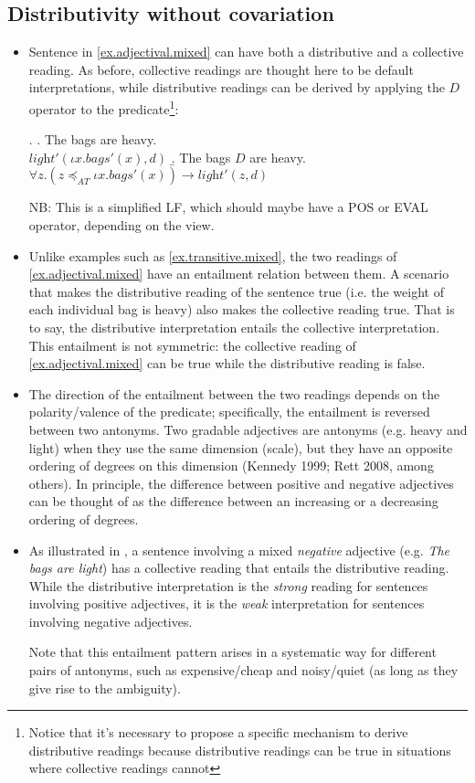 \documentclass[a4paper]{article}
\newcommand{\addMM}[1]{{\leavevmode\color{red}#1}}
\begin{document}
\subsection{Distributivity without covariation}
\begin{itemize}
\item Sentence in \ref{ex.adjectival.mixed} can have both a distributive and a collective reading.  As before, collective readings are thought here to be default interpretations, while distributive readings can be derived by applying the $D$ operator to the predicate\footnote{Notice that it's necessary to propose a specific mechanism to derive distributive readings because distributive readings can be true in situations where collective readings cannot}:

\ex.
\a. The bags are heavy.\\
 $ \textit{light}'(\iota x.\mathit{bags}'(x),d)$
\b. The bags $D$ are heavy.\\
    $\forall z. (z \preceq_{AT}\iota x.\mathit{bags}'(x)) \rightarrow  \textit{light}'(z,d)$

\addMM{NB: This is a simplified LF, which should maybe have a POS or EVAL operator, depending on the view}.

\item Unlike examples such as \ref{ex.transitive.mixed}, the two readings of  \ref{ex.adjectival.mixed} have an entailment relation between them. A scenario that makes the distributive reading of the sentence true (i.e. the weight of each individual bag is heavy) also makes the collective reading true. That is to say, the distributive interpretation entails the collective interpretation. This entailment is not symmetric: the collective reading of \ref{ex.adjectival.mixed} can be true while the distributive reading is false. 

\item The direction of the entailment between the two readings depends on the polarity/valence of the predicate; specifically, the entailment is reversed between two antonyms. Two gradable adjectives are antonyms (e.g. heavy and light) when they use the same dimension (scale), but they have an opposite ordering of degrees on this dimension (Kennedy 1999; Rett 2008, among others). In principle, the difference between positive and negative adjectives can be thought of as the difference between an increasing or a decreasing ordering of degrees.

\item As illustrated in , a sentence involving a mixed \emph{negative} adjective (e.g. \textit{The bags are light}) has a collective reading that entails the distributive reading. While the distributive interpretation is the \emph{strong} reading for sentences involving positive adjectives, it is the \emph{weak} interpretation for sentences involving negative adjectives.  

Note that this entailment pattern arises in a systematic way for different pairs of antonyms, such as expensive/cheap and noisy/quiet (as long as they give rise to the ambiguity). 
\end{itemize}
\end{document}

